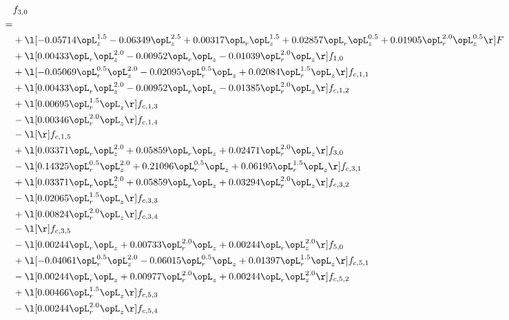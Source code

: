 \begin{alignat}{2} 
\label{eq:f_30_1} 
& f_{3,0} \nonumber \\ 
 = \\ 
& + \l[  -0.05714 \opL_z^{1.5}   -0.06349 \opL_z^{2.5} +  0.00317 \opL_r \opL_z^{1.5} +  0.02857 \opL_r \opL_z^{0.5} +  0.01905 \opL_r^{2.0} \opL_z^{0.5}  \r] F \nonumber \\ 
& + \l[  0.00433 \opL_r \opL_z^{2.0}   -0.00952 \opL_r \opL_z   -0.01039 \opL_r^{2.0} \opL_z  \r] f_{1,0} \nonumber \\ 
& + \l[  -0.05069 \opL_r^{0.5} \opL_z^{2.0}   -0.02095 \opL_r^{0.5} \opL_z +  0.02084 \opL_r^{1.5} \opL_z  \r] f_{c,1,1} \nonumber \\ 
& + \l[  0.00433 \opL_r \opL_z^{2.0}   -0.00952 \opL_r \opL_z   -0.01385 \opL_r^{2.0} \opL_z  \r] f_{c,1,2} \nonumber \\ 
& + \l[  0.00695 \opL_r^{1.5} \opL_z  \r] f_{c,1,3} \nonumber \\ 
& - \l[  0.00346 \opL_r^{2.0} \opL_z  \r] f_{c,1,4} \nonumber \\ 
& - \l[  \r] f_{c,1,5} \nonumber \\ 
& + \l[  0.03371 \opL_r \opL_z^{2.0} +  0.05859 \opL_r \opL_z +  0.02471 \opL_r^{2.0} \opL_z  \r] f_{3,0} \nonumber \\ 
& - \l[  0.14325 \opL_r^{0.5} \opL_z^{2.0} +  0.21096 \opL_r^{0.5} \opL_z +  0.06195 \opL_r^{1.5} \opL_z  \r] f_{c,3,1} \nonumber \\ 
& + \l[  0.03371 \opL_r \opL_z^{2.0} +  0.05859 \opL_r \opL_z +  0.03294 \opL_r^{2.0} \opL_z  \r] f_{c,3,2} \nonumber \\ 
& - \l[  0.02065 \opL_r^{1.5} \opL_z  \r] f_{c,3,3} \nonumber \\ 
& + \l[  0.00824 \opL_r^{2.0} \opL_z  \r] f_{c,3,4} \nonumber \\ 
& - \l[  \r] f_{c,3,5} \nonumber \\ 
& - \l[  0.00244 \opL_r \opL_z +  0.00733 \opL_r^{2.0} \opL_z +  0.00244 \opL_r \opL_z^{2.0}  \r] f_{5,0} \nonumber \\ 
& + \l[  -0.04061 \opL_r^{0.5} \opL_z^{2.0}   -0.06015 \opL_r^{0.5} \opL_z +  0.01397 \opL_r^{1.5} \opL_z  \r] f_{c,5,1} \nonumber \\ 
& - \l[  0.00244 \opL_r \opL_z +  0.00977 \opL_r^{2.0} \opL_z +  0.00244 \opL_r \opL_z^{2.0}  \r] f_{c,5,2} \nonumber \\ 
& + \l[  0.00466 \opL_r^{1.5} \opL_z  \r] f_{c,5,3} \nonumber \\ 
& - \l[  0.00244 \opL_r^{2.0} \opL_z  \r] f_{c,5,4} \nonumber \\ 

\end{alignat}
